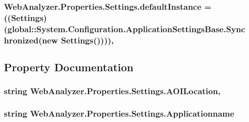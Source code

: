 \subsubsection[{default\+Instance}]{ Web\+Analyzer.\+Properties.\+Settings.\+default\+Instance = (({\bf Settings})(global\+::\+System.\+Configuration.\+Application\+Settings\+Base.\+Synchronized(new {\bf Settings}())))\hspace{0.3cm}{\ttfamily [static]}, {\ttfamily [private]}}\label{class_web_analyzer_1_1_properties_1_1_settings_a384f24a72fe5cd4bd437c9fdecf5e8ce}


\subsection{Property Documentation}
\hypertarget{class_web_analyzer_1_1_properties_1_1_settings_af6dd5e8d3c9287c9dba65dddc86de635}{}
\subsubsection[{A\+O\+I\+Location}]{\setlength{\rightskip}{0pt plus 5cm}string Web\+Analyzer.\+Properties.\+Settings.\+A\+O\+I\+Location\hspace{0.3cm}{\ttfamily [get]}, {\ttfamily [set]}}\label{class_web_analyzer_1_1_properties_1_1_settings_af6dd5e8d3c9287c9dba65dddc86de635}
\hypertarget{class_web_analyzer_1_1_properties_1_1_settings_a2e914901217eeff3abfd251c393bdc1f}{}
\subsubsection[{Applicationname}]{\setlength{\rightskip}{0pt plus 5cm}string Web\+Analyzer.\+Properties.\+Settings.\+Applicationname\hspace{0.3cm}{\ttfamily [get]}}\label{class_web_analyzer_1_1_properties_1_1_settings_a2e914901217eeff3abfd251c393bdc1f}
\hypertarget{class_web_analyzer_1_1_properties_1_1_settings_abef8b78254f10bd2984daa083bca8487}{}
